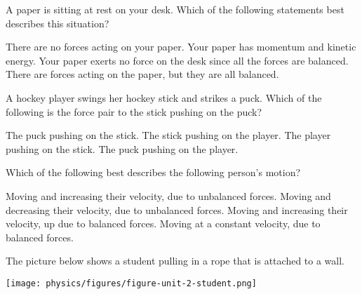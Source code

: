 \documentclass[answers]{exam}
\begin{document}
\begin{questions}
\question 
A paper is sitting at rest on your desk.  Which of the following statements best describes this situation?

\begin{randomizechoices}[norandomize]
    \choice There are no forces acting on your paper.
    \choice Your paper has momentum and kinetic energy.
    \choice Your paper exerts no force on the desk since all the forces are balanced.
    \correctchoice There are forces acting on the paper, but they are all balanced.
\end{randomizechoices}

\question
A hockey player swings her hockey stick and strikes a puck.  Which of the following is the force pair to the stick pushing on the puck?

\begin{randomizechoices}[norandomize]
    \correctchoice The puck pushing on the stick.
    \choice The stick pushing on the player.
    \choice The player pushing on the stick.
    \choice The puck pushing on the player.
\end{randomizechoices}


\question 
Which of the following best describes the following person's motion?


\begin{center}
\end{center}

\begin{randomizechoices}[norandomize]
    \choice Moving and increasing their velocity, due to unbalanced forces.
    \choice Moving and decreasing their velocity, due to unbalanced forces.
    \choice Moving and increasing their velocity, up due to balanced forces.
    \correctchoice Moving at a constant velocity, due to balanced forces.
\end{randomizechoices}

\question 
The picture below shows a student pulling in a rope that is attached to a wall.

\begin{center}
    \texttt{[image: physics/figures/figure-unit-2-student.png]}
\end{center}


\end{questions}
\end{document}
